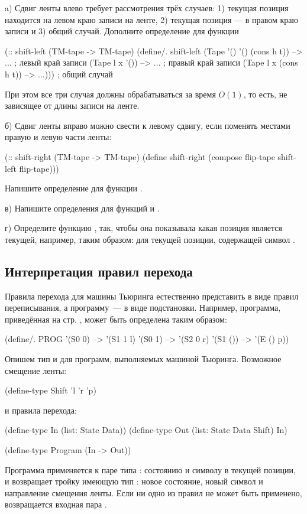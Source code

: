 \begin{Assignment}
a) Сдвиг ленты влево требует рассмотрения трёх случаев: 1) текущая позиция находится на левом краю записи на ленте, 2) текущая позиция --- в правом краю записи и 3) общий случай.
 Дополните определение для функции 
\begin{Definition}
(:: shift-left (TM-tape -> TM-tape)
  (define/. shift-left
    (Tape '() '() (cons h t)) --> ...   ; левый край записи
    (Tape  l x '())           --> ...   ; правый край записи
    (Tape  l x (cons h t))    --> ...))) ; общий случай
\end{Definition}
\noindent
При этом все три случая должны обрабатываться за время $O(1)$, то  есть, не зависящее от длины записи на ленте.

б) Сдвиг ленты вправо можно свести к левому сдвигу, если поменять местами правую и левую части ленты:
\begin{Definition}
(:: shift-right (TM-tape -> TM-tape)
  (define shift-right
    (compose flip-tape shift-left flip-tape)))
\end{Definition}
Напишите определение для функции .

в) Напишите определения для функций  и .

г) Определите функцию , так, чтобы она показывала какая позиция является текущей, например, таким образом:  для текущей позиции, содержащей символ .
\end{Assignment}

\subsection*{Интерпретация правил перехода}

Правила перехода для машины Тьюринга естественно представить в виде правил переписывания, а программу~--- в виде подстановки. Например, программа, приведённая на стр. \pageref{TM-prog}, может быть определена таким образом:
\begin{SchemeCode}
(define/. PROG
  '(S0 0) --> '(S1 1 l)
  '(S0 1) --> '(S2 0 r)
  '(S1 ()) --> '(E () p))
\end{SchemeCode}

Опишем тип и для программ, выполняемых машиной Тьюринга. Возможное смещение ленты:
\begin{SchemeCode}
(define-type Shift  'l 'r 'p)
\end{SchemeCode}
\noindent и правила перехода:
\begin{SchemeCode}
(define-type In  (list: State Data))
(define-type Out 
 (list: State Data Shift) 
 In)

(define-type Program (In -> Out))
\end{SchemeCode}
Программа применяется к паре типа : состоянию и символу в текущей позиции, и возвращает тройку имеющую тип : новое состояние, новый символ и направление смещения ленты. Если ни одно из правил не может быть применено, возвращается входная пара .

